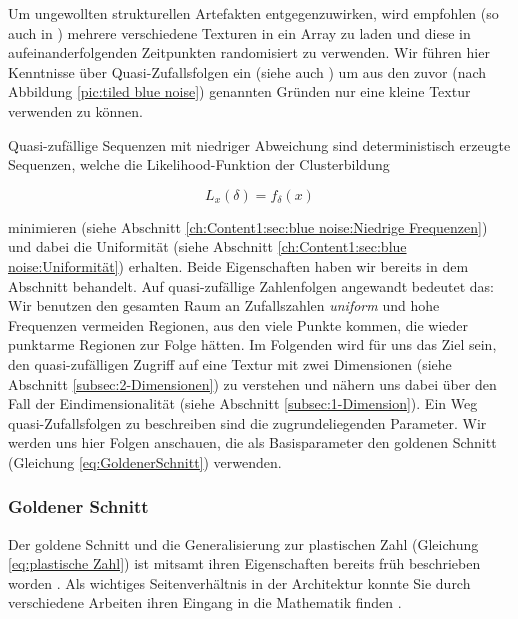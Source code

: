 Um ungewollten strukturellen Artefakten entgegenzuwirken, wird empfohlen (so auch in \cite{bluenoisechrisschied})
mehrere verschiedene  Texturen in ein Array zu laden und diese in aufeinanderfolgenden
Zeitpunkten randomisiert zu verwenden. Wir führen hier Kenntnisse über Quasi-Zufallsfolgen ein (siehe auch \cite{quasirandomsequencesbyRoberts}) 
um aus den zuvor (nach Abbildung \ref{pic:tiled blue noise}) genannten Gründen nur eine kleine  Textur verwenden zu können.\par
Quasi-zufällige Sequenzen mit niedriger Abweichung sind deterministisch erzeugte Sequenzen, welche die Likelihood-Funktion der Clusterbildung

\begin{tcolorbox}[rightrule=3mm, rounded corners=east]
    \begin{equation}\label{eq:Likeli-Hood-Gleichung}
        L_{x}(\delta) = f_{\delta}(x)
    \end{equation}
\end{tcolorbox}

minimieren (siehe Abschnitt \ref{ch:Content1:sec:blue noise:Niedrige Frequenzen}) und dabei die 
Uniformität (siehe Abschnitt \ref{ch:Content1:sec:blue noise:Uniformität}) erhalten. Beide Eigenschaften 
haben wir bereits in dem  Abschnitt behandelt.
Auf quasi-zufällige Zahlenfolgen angewandt bedeutet das: Wir benutzen den gesamten Raum an Zufallszahlen
\textit{uniform} und hohe Frequenzen vermeiden Regionen, aus den viele Punkte kommen, die wieder 
punktarme Regionen zur Folge hätten.   
Im Folgenden wird für uns das Ziel sein, den quasi-zufälligen Zugriff auf eine Textur 
mit zwei Dimensionen (siehe Abschnitt \ref{subsec:2-Dimensionen}) zu verstehen und nähern 
uns dabei über den Fall der Eindimensionalität (siehe Abschnitt \ref{subsec:1-Dimension}).
Ein Weg quasi-Zufallsfolgen zu beschreiben sind die zugrundeliegenden Parameter. 
Wir werden uns hier Folgen anschauen, die als Basisparameter den 
goldenen Schnitt (Gleichung \ref{eq:GoldenerSchnitt}) verwenden.

\subsubsection{Goldener Schnitt}

Der goldene Schnitt und die Generalisierung zur plastischen Zahl (Gleichung \ref{eq:plastische Zahl})
ist mitsamt ihren Eigenschaften bereits früh beschrieben worden \cite{vanderlaanplasticnumber}.
Als wichtiges Seitenverhältnis in der Architektur konnte Sie durch verschiedene Arbeiten ihren 
Eingang in die Mathematik finden \cite{krcadinac2006new}.

